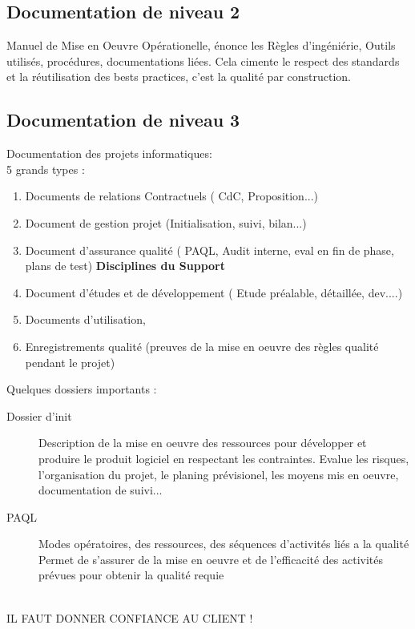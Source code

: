 	\subsection{Documentation de niveau 2}

Manuel de Mise en Oeuvre Opérationelle, énonce les Règles d’ingéniérie, Outils utilisés, procédures, documentations liées.
Cela cimente le respect des standards et la réutilisation des bests practices, c’est la qualité par construction.

	\subsection{Documentation de niveau 3}

Documentation des projets informatiques: \\

5 grands types : 
\begin{enumerate}
\item Documents de relations Contractuels ( CdC, Proposition...)
\item Document de gestion projet (Initialisation, suivi, bilan...)
\item Document d’assurance qualité ( PAQL, Audit interne, eval en fin de phase, plans de test) \textbf{Disciplines du Support}
\item Document d’études et de développement ( Etude préalable, détaillée, dev....)
\item Documents d’utilisation, 
\item Enregistrements qualité (preuves de la mise en oeuvre des règles qualité pendant le projet)
\end{enumerate}


Quelques dossiers importants :
\begin{description}
\item[Dossier d’init] Description de la mise en oeuvre des ressources pour développer et produire le produit logiciel en respectant les contraintes. 
Evalue les risques, l’organisation du projet, le planing prévisionel, les moyens mis en oeuvre, documentation de suivi...

\item[PAQL] Modes opératoires, des ressources, des séquences d’activités liés a la qualité 
Permet de s’assurer de la mise en oeuvre et de l’efficacité des activités prévues pour obtenir la qualité requie
\end{description}
\hfill\\
IL FAUT DONNER CONFIANCE AU CLIENT !

